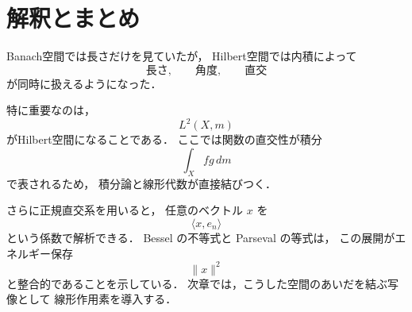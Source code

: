 \section{解釈とまとめ}

Banach空間では長さだけを見ていたが，
Hilbert空間では内積によって
\[
\text{長さ},\qquad \text{角度},\qquad \text{直交}
\]
が同時に扱えるようになった．

特に重要なのは，
\[
L^2(X,m)
\]
がHilbert空間になることである．
ここでは関数の直交性が積分
\[
\int_X f g\,dm
\]
で表されるため，
積分論と線形代数が直接結びつく．

さらに正規直交系を用いると，
任意のベクトル $x$ を
\[
\langle x,e_n\rangle
\]
という係数で解析できる．
Bessel の不等式と Parseval の等式は，
この展開がエネルギー保存
\[
\|x\|^2
\]
と整合的であることを示している．
次章では，こうした空間のあいだを結ぶ写像として
線形作用素を導入する．
